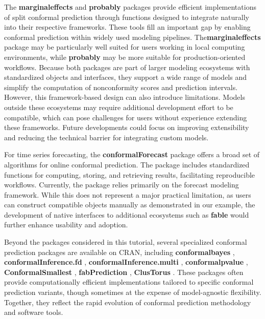 The \textbf{marginaleffects} and \textbf{probably} packages provide efficient
implementations of split conformal prediction through functions designed
to integrate naturally into their respective frameworks. These tools
fill an important gap by enabling conformal prediction within widely
used modeling pipelines. The\textbf{marginaleffects} package may be
particularly well suited for users working in local computing
environments, while \textbf{probably} may be more suitable for
production-oriented workflows. Because both packages are part of larger
modeling ecosystems with standardized objects and interfaces, they
support a wide range of models and simplify the computation of
nonconformity scores and prediction intervals. However, this
framework-based design can also introduce limitations. Models outside
these ecosystems may require additional development effort to be
compatible, which can pose challenges for users without experience
extending these frameworks. Future developments could focus on improving
extensibility and reducing the technical barrier for integrating custom
models.

For time series forecasting, the \textbf{conformalForecast} package offers a broad
set of algorithms for online conformal prediction. The package includes
standardized functions for computing, storing, and retrieving results,
facilitating reproducible workflows. Currently, the package relies
primarily on the forecast modeling framework. While this does not
represent a major practical limitation, as users can construct
compatible objects manually as demonstrated in our example, the
development of native interfaces to additional ecosystems such as
\textbf{fable} \citep{fable} would further enhance usability and adoption.

Beyond the packages considered in this tutorial, several specialized
conformal prediction packages are available on CRAN, including
\textbf{conformalbayes} \citep{conformalbayes},
\textbf{conformalInference.fd} \citep{conformalfd},
\textbf{conformalInference.multi} \citep{conformalmulti},
\textbf{conformalpvalue} \citep{conformalpval},
\textbf{ConformalSmallest} \citep{ConformalSmallest}, \textbf{fabPrediction} \citep{fabpred},
\textbf{ClusTorus} \citep{ClusTorus}. These packages often provide computationally
efficient implementations tailored to specific conformal prediction
variants, though sometimes at the expense of model-agnostic flexibility.
Together, they reflect the rapid evolution of conformal prediction
methodology and software tools.

